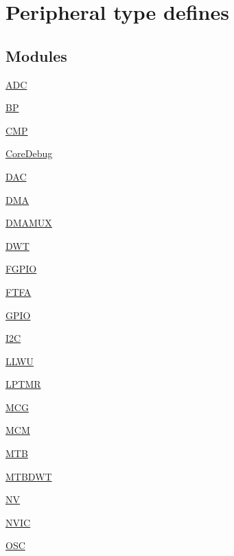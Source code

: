 \hypertarget{group___peripheral__defines}{}\section{Peripheral type defines}
\label{group___peripheral__defines}
\subsection*{Modules}
\begin{DoxyCompactItemize}
\item 
\hyperlink{group___a_d_c___peripheral}{A\+DC}
\item 
\hyperlink{group___b_p___peripheral}{BP}
\item 
\hyperlink{group___c_m_p___peripheral}{C\+MP}
\item 
\hyperlink{group___core_debug___peripheral}{Core\+Debug}
\item 
\hyperlink{group___d_a_c___peripheral}{D\+AC}
\item 
\hyperlink{group___d_m_a___peripheral}{D\+MA}
\item 
\hyperlink{group___d_m_a_m_u_x___peripheral}{D\+M\+A\+M\+UX}
\item 
\hyperlink{group___d_w_t___peripheral}{D\+WT}
\item 
\hyperlink{group___f_g_p_i_o___peripheral}{F\+G\+P\+IO}
\item 
\hyperlink{group___f_t_f_a___peripheral}{F\+T\+FA}
\item 
\hyperlink{group___g_p_i_o___peripheral}{G\+P\+IO}
\item 
\hyperlink{group___i2_c___peripheral}{I2C}
\item 
\hyperlink{group___l_l_w_u___peripheral}{L\+L\+WU}
\item 
\hyperlink{group___l_p_t_m_r___peripheral}{L\+P\+T\+MR}
\item 
\hyperlink{group___m_c_g___peripheral}{M\+CG}
\item 
\hyperlink{group___m_c_m___peripheral}{M\+CM}
\item 
\hyperlink{group___m_t_b___peripheral}{M\+TB}
\item 
\hyperlink{group___m_t_b_d_w_t___peripheral}{M\+T\+B\+D\+WT}
\item 
\hyperlink{group___n_v___peripheral}{NV}
\item 
\hyperlink{group___n_v_i_c___peripheral}{N\+V\+IC}
\item 
\hyperlink{group___o_s_c___peripheral}{O\+SC}

\end{DoxyCompactItemize}
